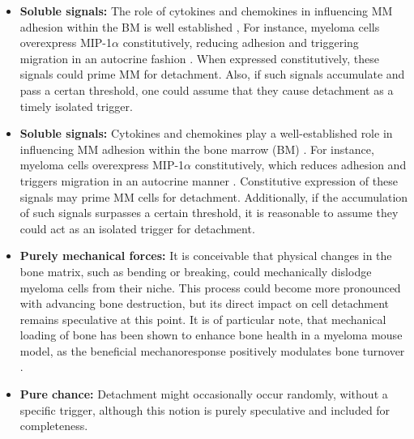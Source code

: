 \begin{itemize}
      \item\textbf{Soluble signals:} The role of cytokines and chemokines
            in influencing MM adhesion within the BM is well established
            \cite{aggarwalChemokinesMultipleMyeloma2006,
                  alsayedMechanismsRegulationCXCR42007}, For instance, myeloma cells
            overexpress MIP-1$\alpha$ constitutively, reducing adhesion and
            triggering migration in an autocrine fashion
            \cite{lentzschMacrophageInflammatoryProtein2003,
                  abeRoleMacrophageInflammatory2002}. When expressed constitutively,
            these signals could prime MM for detachment. Also, if such signals
            accumulate and pass a certan threshold, one could assume that they
            cause detachment as a timely isolated trigger.

      \item\textbf{Soluble signals:} Cytokines and chemokines  play a
            well-established role in influencing MM adhesion within the bone
            marrow (BM) \cite{aggarwalChemokinesMultipleMyeloma2006,
                  alsayedMechanismsRegulationCXCR42007}. For instance, myeloma cells
            overexpress MIP-1$\alpha$ constitutively, which reduces adhesion and
            triggers migration in an autocrine manner
            \cite{lentzschMacrophageInflammatoryProtein2003,
                  abeRoleMacrophageInflammatory2002}. Constitutive expression of these
            signals may prime MM cells for detachment. Additionally, if the
            accumulation of such signals surpasses a certain threshold, it is
            reasonable to assume they could act as an isolated trigger for
            detachment.

      \item\textbf{Purely mechanical forces:} It is conceivable that physical
            changes in the bone matrix, such as bending or breaking, could
            mechanically dislodge myeloma cells from their niche. This process
            could become more pronounced with advancing bone destruction, but
            its direct impact on cell detachment remains speculative at this
            point. It is of particular note, that mechanical loading of bone has
            been shown to enhance bone health in a myeloma mouse model, as the
            beneficial mechanoresponse positively modulates bone turnover
            \cite{rummlerMechanicalLoadingPrevents2021}.

      \item\textbf{Pure chance:} Detachment might occasionally occur randomly,
            without a specific trigger, although this notion is purely
            speculative and included for completeness.

\end{itemize}

